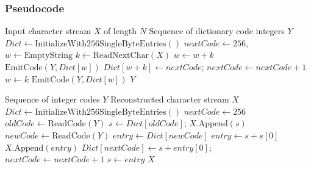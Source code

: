 \documentclass[12pt,a4paper]{article}
\begin{document}
\subsubsection{Pseudocode}
\begin{algorithm}[H]
\caption{LZW Dictionary-Based Compression}
\begin{algorithmic}[1]
\Require Input character stream $X$ of length $N$
\Ensure Sequence of dictionary code integers $Y$
\State $Dict \gets \text{InitializeWith256SingleByteEntries}()$
\State $nextCode \gets 256$, $w \gets \text{EmptyString}$
    \State $k \gets \text{ReadNextChar}(X)$
        \State $w \gets w + k$
    \Else
        \State $\text{EmitCode}(Y, Dict[w])$
            \State $Dict[w + k] \gets nextCode$; $nextCode \gets nextCode + 1$
        \EndIf
        \State $w \gets k$
    \EndIf
\EndWhile
{} $\text{EmitCode}(Y, Dict[w])$ \EndIf
\State \Return $Y$
\end{algorithmic}
\end{algorithm}

\begin{algorithm}[H]
\caption{LZW Decompression}
\begin{algorithmic}[1]
\Require Sequence of integer codes $Y$
\Ensure Reconstructed character stream $X$
\State $Dict \gets \text{InitializeWith256SingleByteEntries}()$
\State $nextCode \gets 256$
\State $oldCode \gets \text{ReadCode}(Y)$
\State $s \gets Dict[oldCode]$; $X.\text{Append}(s)$
    \State $newCode \gets \text{ReadCode}(Y)$
        \State $entry \gets Dict[newCode]$
    \Else {}
        \State $entry \gets s + s[0]$
    \EndIf
    \State $X.\text{Append}(entry)$
        \State $Dict[nextCode] \gets s + entry[0]$; $nextCode \gets nextCode + 1$
    \EndIf
    \State $s \gets entry$
\EndWhile
\State \Return $X$
\end{algorithmic}
\end{algorithm}
\end{document}
